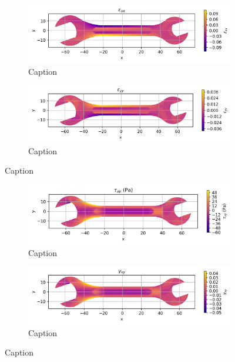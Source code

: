 \documentclass{article}  %
\begin{document}
\begin{figure}[H]
  \centering
  \begin{subfigure}[t]{0.49\textwidth}
    \centering
    \includegraphics[width=\textwidth]{GRAFICOS/Case c - epsilon_xx.png}
    \caption{Caption}
    \label{fig:deformada_reacciones}
  \end{subfigure}
  \hfill
  \begin{subfigure}[t]{0.49\textwidth}
    \centering
    \includegraphics[width=\textwidth]{GRAFICOS/Case c - epsilon_yy.png}
    \caption{Caption}
    \label{fig:von_mises}
  \end{subfigure}
  \caption{Caption}
  \label{fig:analisis_estructural}
\end{figure}


\begin{figure}[H]
  \centering
  \begin{subfigure}[t]{0.49\textwidth}
    \centering
    \includegraphics[width=\textwidth]{GRAFICOS/Case c - tau_xy.png}
    \caption{Caption}
    \label{fig:deformada_reacciones}
  \end{subfigure}
  \hfill
  \begin{subfigure}[t]{0.49\textwidth}
    \centering
    \includegraphics[width=\textwidth]{GRAFICOS/Case c - gamma_xy.png}
    \caption{Caption}
    \label{fig:von_mises}
  \end{subfigure}
  \caption{Caption}
  \label{fig:analisis_estructural}
\end{figure}
\end{document}

